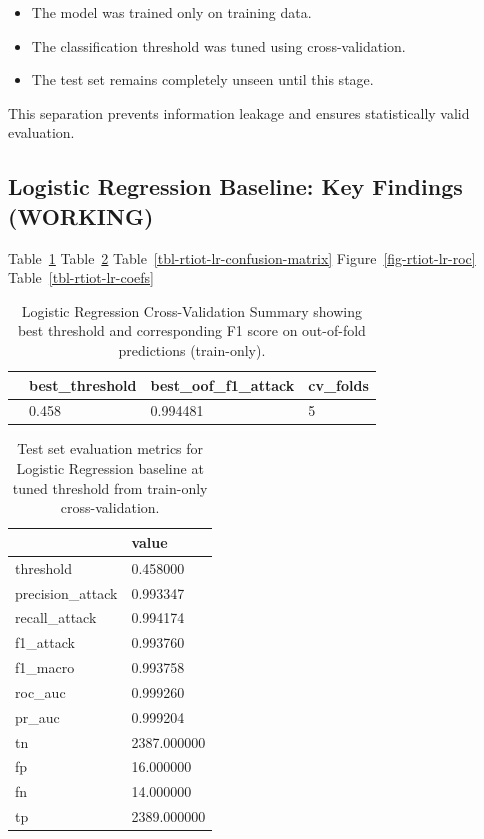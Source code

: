 \documentclass[
  letterpaper,
  DIV=11,
  numbers=noendperiod]{scrartcl}
\providecommand{\tightlist}{%
  \setlength{\itemsep}{0pt}\setlength{\parskip}{0pt}}
\begin{document}
\begin{itemize}
\tightlist
\item
  The model was trained only on training data.
\item
  The classification threshold was tuned using cross-validation.
\item
  The test set remains completely unseen until this stage.
\end{itemize}

This separation prevents information leakage and ensures statistically
valid evaluation.

\subsection{Logistic Regression Baseline: Key Findings
(WORKING)}\label{logistic-regression-baseline-key-findings-working}

Table~\ref{tbl-rtiot-lr-cv-summary} Table~\ref{tbl-rtiot-lr-test-eval}
Table~\ref{tbl-rtiot-lr-confusion-matrix} Figure~\ref{fig-rtiot-lr-roc}
Table~\ref{tbl-rtiot-lr-coefs}

\begin{longtable}[]{@{}llll@{}}

\caption{\label{tbl-rtiot-lr-cv-summary}Logistic Regression
Cross-Validation Summary showing best threshold and corresponding F1
score on out-of-fold predictions (train-only).}

\tabularnewline

\toprule\noalign{}
& best\_threshold & best\_oof\_f1\_attack & cv\_folds \\
\midrule\noalign{}
\endhead
\bottomrule\noalign{}
\endlastfoot
0 & 0.458 & 0.994481 & 5 \\

\end{longtable}

\begin{longtable}[]{@{}ll@{}}

\caption{\label{tbl-rtiot-lr-test-eval}Test set evaluation metrics for
Logistic Regression baseline at tuned threshold from train-only
cross-validation.}

\tabularnewline

\toprule\noalign{}
& value \\
\midrule\noalign{}
\endhead
\bottomrule\noalign{}
\endlastfoot
threshold & 0.458000 \\
precision\_attack & 0.993347 \\
recall\_attack & 0.994174 \\
f1\_attack & 0.993760 \\
f1\_macro & 0.993758 \\
roc\_auc & 0.999260 \\
pr\_auc & 0.999204 \\
tn & 2387.000000 \\
fp & 16.000000 \\
fn & 14.000000 \\
tp & 2389.000000 \\

\end{longtable}
\end{document}
